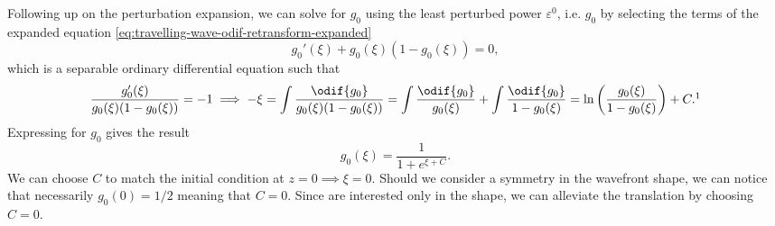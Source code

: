 Following up on the perturbation expansion, we can solve for \(g_0\) using the least perturbed power 
    \(\varepsilon^{0}\), i.e. \(g_0\) by selecting the terms of the expanded equation 
    \cref{eq:travelling-wave-odif-retransform-expanded} \[
        g_0'(\xi) + g_0(\xi)(1 - g_0(\xi)) = 0,
    \] which is a separable ordinary differential equation such that \[
    \frac{g_0'(\xi)}{g_0(\xi)(1 - g_0(\xi))} = -1 \implies -\xi = \int \frac{\odif{g_0}}{g_0(\xi)(1 - g_0(\xi))} = \int
    \frac{\odif{g_0}}{g_0(\xi)} + \int \frac{\odif{g_0}}{1 - g_0(\xi)} = \ln \left( \frac{g_0(\xi)}{1 - g_0(\xi)}
    \right) + C.\footnote{Notice that \(g_0 \in (0,1)\) guarantees that the logarithm is real and finite.}
    \] %
Expressing for \(g_0\) gives the result \begin{equation}
    \label{eq:g-0}
    g_0(\xi) = \frac{1}{1 + e^{\xi + C}}.
\end{equation}
We can choose \(C\) to match the initial condition at \(z = 0 \implies \xi = 0\).
Should we consider a symmetry in the wavefront shape, we can notice that necessarily \(g_0(0) = 1/2\) meaning that \(C
    = 0\).
Since are interested only in the shape, we can alleviate the translation by choosing \(C=0\).

